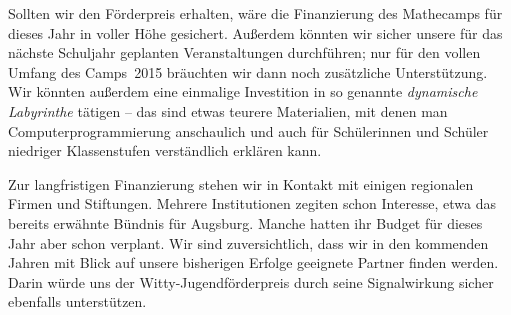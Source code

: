 \documentclass[12pt]{zettel}
\begin{document}
Sollten wir den Förderpreis erhalten, wäre die Finanzierung des Mathecamps für dieses Jahr in
voller Höhe gesichert. Außerdem könnten wir sicher unsere für das nächste Schuljahr
geplanten Veranstaltungen durchführen; nur für den vollen Umfang des
Camps~2015 bräuchten wir dann noch zusätzliche Unterstützung. Wir könnten außerdem
eine einmalige Investition in so genannte \emph{dynamische Labyrinthe} tätigen --
das sind etwas teurere Materialien, mit denen man
Computerprogrammierung anschaulich und auch für Schülerinnen und Schüler niedriger Klassenstufen
verständlich erklären kann.

Zur langfristigen Finanzierung stehen wir in Kontakt mit einigen regionalen Firmen und Stiftungen. Mehrere Institutionen zegiten schon Interesse, etwa das bereits erwähnte Bündnis für Augsburg. Manche hatten ihr Budget für dieses Jahr aber schon verplant. Wir sind zuversichtlich, dass wir in den kommenden Jahren mit Blick auf unsere bisherigen Erfolge geeignete Partner finden werden. Darin würde uns der Witty-Jugendförderpreis durch seine Signalwirkung sicher ebenfalls unterstützen.
\end{document}
